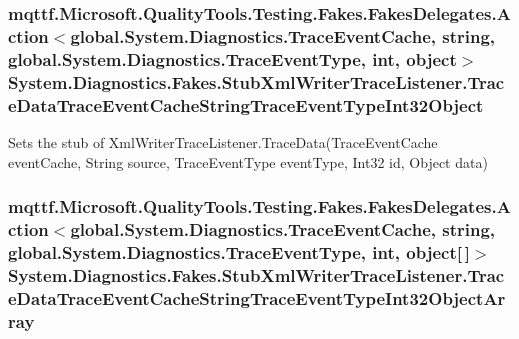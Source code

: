 \hypertarget{class_system_1_1_diagnostics_1_1_fakes_1_1_stub_xml_writer_trace_listener_a1284b8f36f6d91e77618cf6c9c6b7f00}{
\subsubsection[{Trace\-Data\-Trace\-Event\-Cache\-String\-Trace\-Event\-Type\-Int32\-Object}]{\setlength{\rightskip}{0pt plus 5cm}mqttf.\-Microsoft.\-Quality\-Tools.\-Testing.\-Fakes.\-Fakes\-Delegates.\-Action$<$global.\-System.\-Diagnostics.\-Trace\-Event\-Cache, string, global.\-System.\-Diagnostics.\-Trace\-Event\-Type, int, object$>$ System.\-Diagnostics.\-Fakes.\-Stub\-Xml\-Writer\-Trace\-Listener.\-Trace\-Data\-Trace\-Event\-Cache\-String\-Trace\-Event\-Type\-Int32\-Object}}\label{class_system_1_1_diagnostics_1_1_fakes_1_1_stub_xml_writer_trace_listener_a1284b8f36f6d91e77618cf6c9c6b7f00}


Sets the stub of Xml\-Writer\-Trace\-Listener.\-Trace\-Data(\-Trace\-Event\-Cache event\-Cache, String source, Trace\-Event\-Type event\-Type, Int32 id, Object data)

\hypertarget{class_system_1_1_diagnostics_1_1_fakes_1_1_stub_xml_writer_trace_listener_a5be8adbad8748260f3e6197d0e0958e7}{
\subsubsection[{Trace\-Data\-Trace\-Event\-Cache\-String\-Trace\-Event\-Type\-Int32\-Object\-Array}]{\setlength{\rightskip}{0pt plus 5cm}mqttf.\-Microsoft.\-Quality\-Tools.\-Testing.\-Fakes.\-Fakes\-Delegates.\-Action$<$global.\-System.\-Diagnostics.\-Trace\-Event\-Cache, string, global.\-System.\-Diagnostics.\-Trace\-Event\-Type, int, object\mbox{[}$\,$\mbox{]}$>$ System.\-Diagnostics.\-Fakes.\-Stub\-Xml\-Writer\-Trace\-Listener.\-Trace\-Data\-Trace\-Event\-Cache\-String\-Trace\-Event\-Type\-Int32\-Object\-Array}}\label{class_system_1_1_diagnostics_1_1_fakes_1_1_stub_xml_writer_trace_listener_a5be8adbad8748260f3e6197d0e0958e7}


